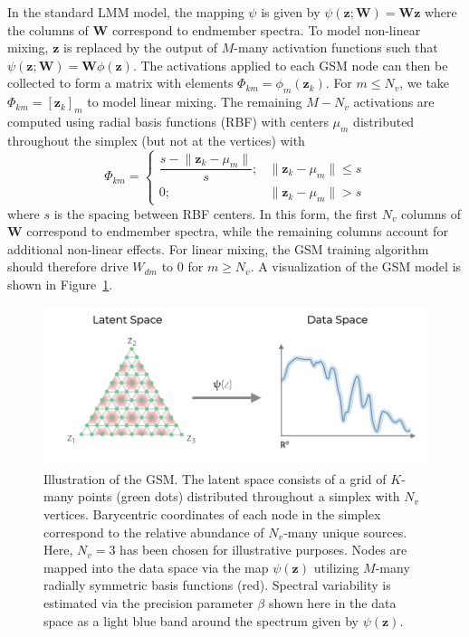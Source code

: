 \documentclass[remotesensing,article,submit,pdftex,moreauthors]{Definitions/mdpi}
\begin{document}
In the standard LMM model, the mapping $\psi$ is given by $\psi(\mathbf{z};\mathbf{W}) = \mathbf{W}\mathbf{z}$ where the columns of $\mathbf{W}$ correspond to endmember spectra. To model non-linear mixing, $\mathbf{z}$ is replaced by the output of $M$-many activation functions such that $\psi(\mathbf{z};\mathbf{W}) = \mathbf{W}\phi(\mathbf{z})$. The activations applied to each GSM node can then be collected to form a matrix with elements $\Phi_{km} = \phi_m(\mathbf{z}_k)$. For $m \leq N_v$, we take $\Phi_{km} = [\mathbf{z}_k]_m$ to model linear mixing. The remaining  $M-N_v$ activations are computed using radial basis functions (RBF) with centers $\mu_m$ distributed throughout the simplex (but not at the vertices) with 
\begin{equation}\label{eq:act-function}
    \Phi_{km} = \begin{cases}
        \dfrac{s - \lVert \mathbf{z}_k - \mu_m \rVert}{s}; & \lVert \mathbf{z}_k - \mu_m \rVert \leq s \\
        0; & \lVert \mathbf{z}_k - \mu_m \rVert > s
    \end{cases}
\end{equation}
where $s$ is the spacing between RBF centers. In this form, the first $N_v$ columns of $\mathbf{W}$ correspond to endmember spectra, while the remaining columns account for additional non-linear effects. For linear mixing, the GSM training algorithm should therefore drive $W_{dm}$ to $0$ for $m\geq N_v$. A visualization of the GSM model is shown in Figure~\ref{fig:gsm-diagram}.

\begin{figure}[H]
\includegraphics[width=\columnwidth]{methods/gsm/gsm-diagram.png}
\caption{Illustration of the GSM. The latent space consists of a grid of $K$-many points (green dots) distributed throughout a simplex with $N_v$ vertices. Barycentric coordinates of each node in the simplex correspond to the relative abundance of $N_v$-many unique sources. Here, $N_v=3$ has been chosen for illustrative purposes. Nodes are mapped into the data space via the map $\psi(\mathbf{z})$ utilizing $M$-many radially symmetric basis functions (red). Spectral variability is estimated via the precision parameter $\beta$ shown here in the data space as a light blue band around the spectrum given by $\psi(\mathbf{z})$.}
\label{fig:gsm-diagram}
\end{figure}  
\end{document}
